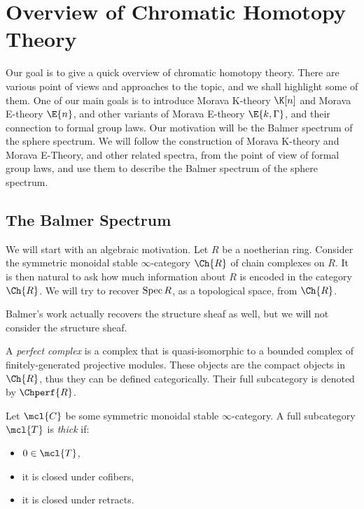 \section{Overview of Chromatic Homotopy Theory}

Our goal is to give a quick overview of chromatic homotopy theory.
There are various point of views and approaches to the topic, and we shall highlight some of them.
One of our main goals is to introduce Morava K-theory $\K[n]$ and Morava E-theory $\E{n}$, and other variants of Morava E-theory $\E{k,\Gamma}$, and their connection to formal group laws.
Our motivation will be the Balmer spectrum of the sphere spectrum.
We will follow the construction of Morava K-theory and Morava E-Theory, and other related spectra, from the point of view of formal group laws, and use them to describe the Balmer spectrum of the sphere spectrum.



\subsection{The Balmer Spectrum}

We will start with an algebraic motivation.
Let $R$ be a noetherian ring.
Consider the symmetric monoidal stable $\infty$-category $\Ch{R}$ of chain complexes on $R$.
It is then natural to ask how much information about $R$ is encoded in the category $\Ch{R}$.
We will try to recover $\operatorname{Spec} R$, as a topological space, from $\Ch{R}$.

\begin{remark}
	Balmer's work \cite[6.3]{BalSpec} actually recovers the structure sheaf as well, but we will not consider the structure sheaf.
\end{remark}

\begin{definition}
	A \emph{perfect complex} is a complex that is quasi-isomorphic to a bounded complex of finitely-generated projective modules.
	These objects are the compact objects in $\Ch{R}$, thus they can be defined categorically.
	Their full subcategory is denoted by $\Chperf{R}$.
\end{definition}

\begin{definition}
	Let $\mcl{C}$ be some symmetric monoidal stable $\infty$-category.
	A full subcategory $\mcl{T}$ is \emph{thick} if:
	\begin{itemize}
		\item $0 \in \mcl{T}$,
		\item it is closed under cofibers,
		\item it is closed under retracts.
	\end{itemize}
\end{definition}

